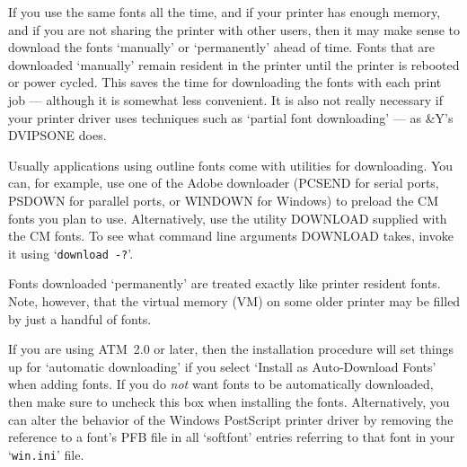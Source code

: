 If you use the same fonts all the time, and if your printer has enough
memory, and if you are not sharing the printer with other users,
then it may make sense to download the fonts `manually' or
`permanently' ahead of time.  
Fonts that are downloaded `manually' remain resident in the printer until
the printer is rebooted or power cycled.  
This saves the time for downloading the fonts with each print job
--- although it is somewhat less convenient. It is also not
really necessary if your printer driver uses techniques such as 
`partial font downloading' --- as {\Y&Y}'s DVI\-PS\-ONE does. 


Usually applications using outline fonts come with utilities for downloading.
You can, for example, use one of the Adobe downloader 
(PCSEND for serial ports, PSDOWN for parallel ports, or WINDOWN for Windows)
to preload the CM fonts you plan to use.  
Alternatively, use the utility DOWNLOAD supplied with the CM fonts.  
To see what command line arguments DOWNLOAD takes, invoke it using 
`{\tt download -?}'.


Fonts downloaded `permanently' are treated exactly like printer
resident fonts. 
Note, however, that the virtual memory (VM) on some older printer
may be filled by just a handful of fonts.
%

If you are using ATM~2.0 or later, then the installation procedure will set
things up for `automatic downloading'
if you select `Install as Auto-Download Fonts' when adding fonts.
If you do {\it not\/} want fonts to be automatically downloaded,
then make sure to uncheck this box when installing the fonts.
Alternatively, you can alter the behavior of the
Windows PostScript printer driver by
removing the reference to a font's PFB file in all `softfont' entries
referring to that font in your `{\tt win.ini}' file.



